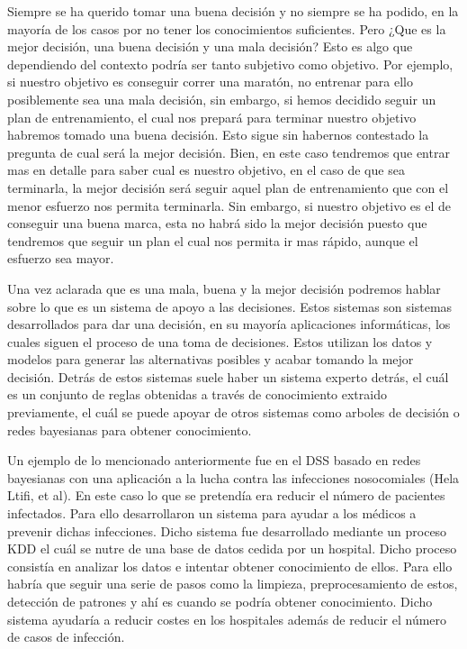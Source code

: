 \newline

Siempre se ha querido tomar una buena decisión y no siempre se ha podido, en la mayoría de los casos
por no tener los conocimientos suficientes. Pero ¿Que es la mejor decisión, una buena decisión y una mala decisión?
Esto es algo que dependiendo del contexto podría ser tanto subjetivo como objetivo. Por ejemplo, si nuestro
objetivo es conseguir correr una maratón, no entrenar para ello posiblemente sea una mala decisión,
sin embargo, si hemos decidido seguir un plan de entrenamiento, el cual nos prepará para terminar
nuestro objetivo habremos tomado una buena decisión. Esto sigue sin habernos contestado la pregunta
de cual será la mejor decisión. Bien, en este caso tendremos que entrar mas en detalle para saber
cual es nuestro objetivo, en el caso de que sea terminarla, la mejor decisión será seguir aquel
plan de entrenamiento que con el menor esfuerzo nos permita terminarla. Sin embargo, si nuestro objetivo
es el de conseguir una buena marca, esta no habrá sido la mejor decisión puesto que tendremos que
seguir un plan el cual nos permita ir mas rápido, aunque el esfuerzo sea mayor.

Una vez aclarada que es una mala, buena y la mejor decisión podremos hablar sobre lo que es un sistema
de apoyo a las decisiones. Estos sistemas son sistemas desarrollados para dar una decisión, en su mayoría
aplicaciones informáticas, los cuales siguen el proceso de una toma de decisiones. Estos utilizan
los datos y modelos para generar las alternativas posibles y acabar tomando la mejor decisión. Detrás
de estos sistemas suele haber un sistema experto detrás, el cuál es un conjunto de reglas obtenidas
a través de conocimiento extraido previamente, el cuál se puede apoyar de otros sistemas como
arboles de decisión o redes bayesianas para obtener conocimiento.

Un ejemplo de lo mencionado anteriormente fue en el DSS basado en redes bayesianas con una aplicación
a la lucha contra las infecciones nosocomiales (Hela Ltifi, et al). En este caso lo que se pretendía
era reducir el número de pacientes infectados. Para ello desarrollaron un sistema para ayudar a los
médicos a prevenir dichas infecciones. Dicho sistema fue desarrollado mediante un proceso KDD el
cuál se nutre de una base de datos cedida por un hospital. Dicho proceso consistía en analizar los datos
e intentar obtener conocimiento de ellos. Para ello habría que seguir una serie de pasos como la
limpieza, preprocesamiento de estos, detección de patrones y ahí es cuando se podría obtener conocimiento.
Dicho sistema ayudaría a reducir costes en los hospitales además de reducir el número de casos de infección.

